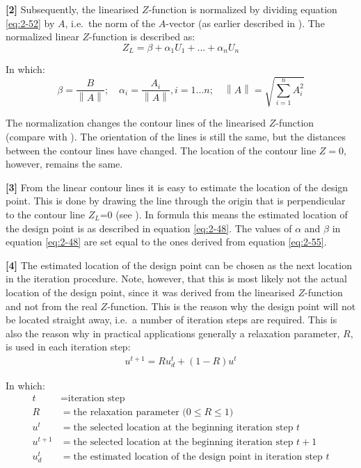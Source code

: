\textbf{[2]} Subsequently, the linearised $Z$-function is normalized by dividing equation \eqref{eq:2-52} by \textbar \textbar $A$\textbar \textbar , i.e.\ the norm of the $A$-vector (as earlier described in ). The normalized linear $Z$-function is described as: 
\begin{equation}
Z_{L} =\beta +\alpha _{1} U_{1} +...+\alpha _{n} U_{n}  \label{eq:2-54} 
\end{equation}

In which:
\begin{equation}
\beta =\frac{B}{\left\| A\right\| } ;\quad \alpha _{i} =\frac{A_{i} }{\left\| A\right\| } ,i=1...n;\quad \left\| A\right\| =\sqrt{\sum _{i=1}^{n}A_{i} ^{2}  }  \label{eq:2-55}  
\end{equation}

The normalization changes the contour lines of the linearised $Z$-function (compare  with ). The orientation of the lines is still the same, but the distances between the contour lines have changed. The location of the contour line $Z=0$, however, remains the same. 

\textbf{[3]} From the linear contour lines it is easy to estimate the location of the design point. This is done by drawing the line through the origin that is perpendicular to the contour line $Z_L$=0 (see ). In formula this means the estimated location of the design point is as described in equation \eqref{eq:2-48}. The values of $\alpha$ and $\beta$ in equation \eqref{eq:2-48} are set equal to the ones derived from equation \eqref{eq:2-55}.

\textbf{[4]} The estimated location of the design point can be chosen as the next location in the iteration procedure.
Note, however, that this is most likely not the actual location of the design point, since it was derived from the linearised $Z$-function and not from the real $Z$-function.
This is the reason why the design point will not be located straight away, i.e.\ a number of iteration steps are required.
This is also the reason why in practical applications generally a relaxation parameter, $R$, is used in each iteration step: 
\begin{align}
u^{t+1} =R u_{d}^{t} +\left(1-R \right)u^{t}  \label{eq:2-56}
\end{align}

In which:\begin{align*}
t &= \text{iteration step}\\
R &= \text{the relaxation parameter ($0\leq R \leq1$)}\\
u^t &= \text{the selected location at the beginning iteration step $t$}\\
u^{t+1} &= \text{the selected location at the beginning iteration step $t+1$}\\
u_d^t &= \text{the estimated location of the design point in iteration step $t$}
\end{align*}

